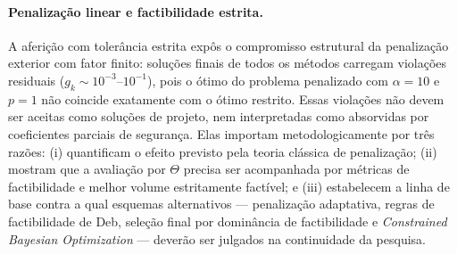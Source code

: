 \paragraph{Penalização linear e factibilidade estrita.}
A aferição com tolerância estrita expôs o compromisso estrutural da penalização exterior com fator finito: soluções finais de todos os métodos carregam violações residuais ($g_k \sim 10^{-3}$--$10^{-1}$), pois o ótimo do problema penalizado com $\alpha = 10$ e $p = 1$ não coincide exatamente com o ótimo restrito. Essas violações não devem ser aceitas como soluções de projeto, nem interpretadas como absorvidas por coeficientes parciais de segurança. Elas importam metodologicamente por três razões: (i) quantificam o efeito previsto pela teoria clássica de penalização; (ii) mostram que a avaliação por $\Theta$ precisa ser acompanhada por métricas de factibilidade e melhor volume estritamente factível; e (iii) estabelecem a linha de base contra a qual esquemas alternativos — penalização adaptativa, regras de factibilidade de Deb, seleção final por dominância de factibilidade e \textit{Constrained Bayesian Optimization} — deverão ser julgados na continuidade da pesquisa.

